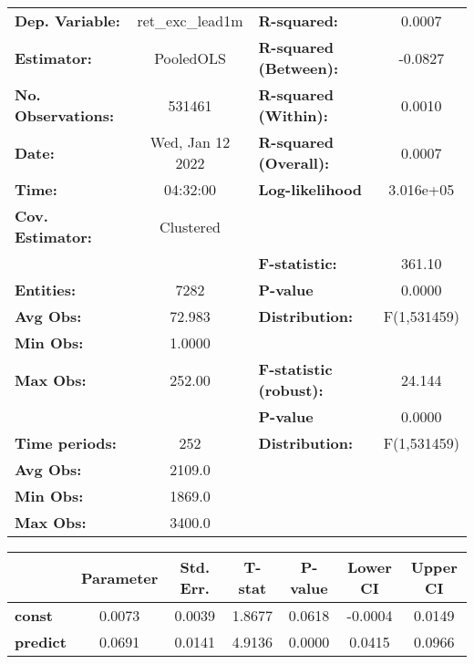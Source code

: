 \begin{center}
\begin{tabular}{lclc}
\toprule
\textbf{Dep. Variable:}    &  ret\_exc\_lead1m  & \textbf{  R-squared:         }   &      0.0007      \\
\textbf{Estimator:}        &     PooledOLS      & \textbf{  R-squared (Between):}  &     -0.0827      \\
\textbf{No. Observations:} &       531461       & \textbf{  R-squared (Within):}   &      0.0010      \\
\textbf{Date:}             &  Wed, Jan 12 2022  & \textbf{  R-squared (Overall):}  &      0.0007      \\
\textbf{Time:}             &      04:32:00      & \textbf{  Log-likelihood     }   &    3.016e+05     \\
\textbf{Cov. Estimator:}   &     Clustered      & \textbf{                     }   &                  \\
\textbf{}                  &                    & \textbf{  F-statistic:       }   &      361.10      \\
\textbf{Entities:}         &        7282        & \textbf{  P-value            }   &      0.0000      \\
\textbf{Avg Obs:}          &       72.983       & \textbf{  Distribution:      }   &   F(1,531459)    \\
\textbf{Min Obs:}          &       1.0000       & \textbf{                     }   &                  \\
\textbf{Max Obs:}          &       252.00       & \textbf{  F-statistic (robust):} &      24.144      \\
\textbf{}                  &                    & \textbf{  P-value            }   &      0.0000      \\
\textbf{Time periods:}     &        252         & \textbf{  Distribution:      }   &   F(1,531459)    \\
\textbf{Avg Obs:}          &       2109.0       & \textbf{                     }   &                  \\
\textbf{Min Obs:}          &       1869.0       & \textbf{                     }   &                  \\
\textbf{Max Obs:}          &       3400.0       & \textbf{                     }   &                  \\
\bottomrule
\end{tabular}
\begin{tabular}{lcccccc}
                 & \textbf{Parameter} & \textbf{Std. Err.} & \textbf{T-stat} & \textbf{P-value} & \textbf{Lower CI} & \textbf{Upper CI}  \\
\midrule
\textbf{const}   &       0.0073       &       0.0039       &      1.8677     &      0.0618      &      -0.0004      &       0.0149       \\
\textbf{predict} &       0.0691       &       0.0141       &      4.9136     &      0.0000      &       0.0415      &       0.0966       \\
\bottomrule
\end{tabular}
\end{center}
